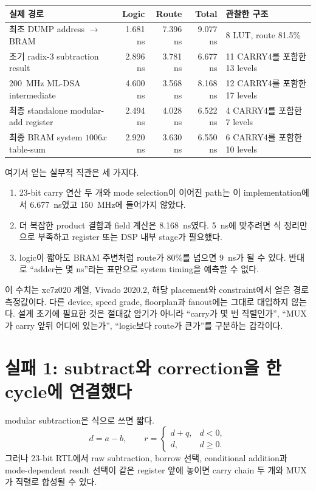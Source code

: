 \begin{longtable}{L{45mm}r r r L{45mm}}
\toprule
실제 경로 & Logic & Route & Total & 관찰한 구조 \\
\midrule
최초 DUMP address $\rightarrow$ BRAM &
1.681 ns & 7.396 ns & 9.077 ns &
8 LUT, route 81.5\% \\
초기 radix-3 subtraction result &
2.896 ns & 3.781 ns & 6.677 ns &
11 CARRY4를 포함한 13 levels \\
200~MHz ML-DSA intermediate &
4.600 ns & 3.568 ns & 8.168 ns &
12 CARRY4를 포함한 17 levels \\
최종 standalone modular-add register &
2.494 ns & 4.028 ns & 6.522 ns &
4 CARRY4를 포함한 7 levels \\
최종 BRAM system $1006x$ table-sum &
2.920 ns & 3.630 ns & 6.550 ns &
6 CARRY4를 포함한 10 levels \\
\bottomrule
\end{longtable}

여기서 얻는 실무적 직관은 세 가지다.

\begin{enumerate}
  \item 23-bit carry 연산 두 개와 mode selection이 이어진 path는 이
        implementation에서 6.677~ns였고 150~MHz에 들어가지 않았다.
  \item 더 복잡한 product 결합과 field 계산은 8.168~ns였다. 5~ns에
        맞추려면 식 정리만으로 부족하고 register 또는 DSP 내부 stage가 필요했다.
  \item logic이 짧아도 BRAM 주변처럼 route가 80\%를 넘으면 9~ns가 될 수 있다.
        반대로 “adder는 몇 ns”라는 표만으로 system timing을 예측할 수 없다.
\end{enumerate}

이 수치는 xc7z020 계열, Vivado 2020.2, 해당 placement와 constraint에서 얻은
경로 측정값이다. 다른 device, speed grade, floorplan과 fanout에는 그대로
대입하지 않는다. 설계 초기에 필요한 것은 절대값 암기가 아니라
“carry가 몇 번 직렬인가”, “MUX가 carry 앞뒤 어디에 있는가”,
“logic보다 route가 큰가”를 구분하는 감각이다.

\section{실패 1: subtract와 correction을 한 cycle에 연결했다}

modular subtraction은 식으로 쓰면 짧다.
\[
d=a-b,\qquad r=
\begin{cases}
d+q,&d<0,\\
d,&d\ge0.
\end{cases}
\]
그러나 23-bit RTL에서 raw subtraction, borrow 선택, conditional addition과
mode-dependent result 선택이 같은 register 앞에 놓이면 carry chain 두 개와
MUX가 직렬로 합성될 수 있다.

